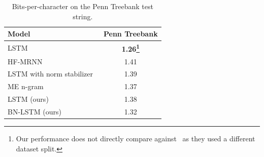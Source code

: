 \documentclass{article} %
\begin{document}
\begin{figure}
  \center%
  \hspace{2mm}%
\end{figure}

\begin{table}
\center
\begin{tabular}{@{}lc@{}}
  \toprule
  \bf Model & \bf Penn Treebank \\
  \midrule
  LSTM~\cite{graves2013generating} & \bf 1.26\footnote{Our performance does not directly compare against~\cite{graves2013generating} as they used a different dataset split.}
\\
  HF-MRNN~\cite{mikolov2012subword} & 1.41 \\
  LSTM with norm stabilizer~\cite{krueger} & 1.39 \\
  ME n-gram~\cite{mikolov2012subword} & 1.37 \\
  \midrule
  LSTM (ours) & 1.38 \\
  BN-LSTM (ours) & 1.32 \\
  \bottomrule
\end{tabular}
\caption{Bits-per-character on the Penn Treebank test string.}
\label{tab:ptb_test}
\end{table}
\end{document}
